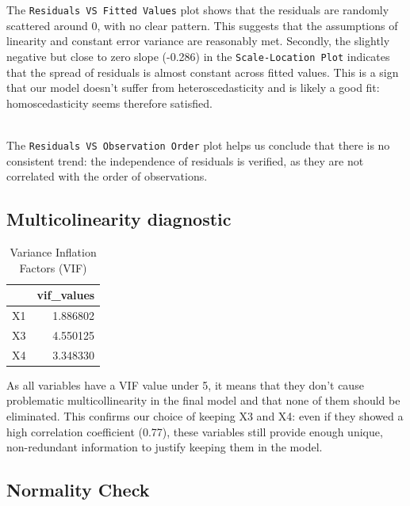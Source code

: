 \documentclass[
  11pt,
]{article}
\begin{document}
The \texttt{Residuals\ VS\ Fitted\ Values} plot shows that the residuals
are randomly scattered around 0, with no clear pattern. This suggests
that the assumptions of linearity and constant error variance are
reasonably met. Secondly, the slightly negative but close to zero slope
(-0.286) in the \texttt{Scale-Location\ Plot} indicates that the spread
of residuals is almost constant across fitted values. This is a sign
that our model doesn't suffer from heteroscedasticity and is likely a
good fit: homoscedasticity seems therefore satisfied.\\
\strut \\
The \texttt{Residuals\ VS\ Observation\ Order} plot helps us conclude
that there is no consistent trend: the independence of residuals is
verified, as they are not correlated with the order of observations.

\subsection{Multicolinearity
diagnostic}\label{multicolinearity-diagnostic}

\begingroup\fontsize{8}{10}\selectfont

\begin{longtable}[t]{lr}
\caption{\label{tab:unnamed-chunk-20}Variance Inflation Factors (VIF)}\\
\toprule
 & vif\_values\\
\midrule
X1 & 1.886802\\
X3 & 4.550125\\
X4 & 3.348330\\
\bottomrule
\end{longtable}
\endgroup{}

As all variables have a VIF value under 5, it means that they don't
cause problematic multicollinearity in the final model and that none of
them should be eliminated. This confirms our choice of keeping X3 and
X4: even if they showed a high correlation coefficient (0.77), these
variables still provide enough unique, non-redundant information to
justify keeping them in the model.

\subsection{Normality Check}\label{normality-check}
\end{document}
